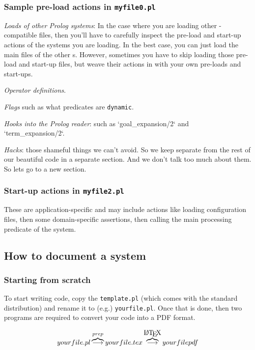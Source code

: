 \subsubsection{Sample pre-load actions in {\tt myfile0.pl}}

\bi \item{\em Loads of other Prolog systems}: In the case where you
are loading other {\PROD}-compatible  files, then  you'll have to
carefully inspect the pre-load and start-up actions of the systems
you are loading. In the best case, you can just load the main files
of the other {\PROD}s. However, sometimes you have to skip loading
those pre-load and start-up files, but weave their actions in with
your own pre-loads and start-ups. \item {\em Operator definitions}.
\item {\em Flags} such as what predicates are {\tt dynamic}. \item
{\em Hooks into the Prolog reader}: such as `goal_expansion/2` and
`term_expansion/2`. \item {\em Hacks}: those shameful things  we
can't avoid. So we   keep separate from the rest of our beautiful
code in a separate section. And we don't talk too much about them. So
lets go to a new section. \ei

\subsubsection{Start-up actions in {\tt myfile2.pl}}

These are application-specific and may include actions like loading
configuration files, then some domain-specific assertions, then
calling the main processing predicate of the system.


\subsection{How to document a {\PROD} system}

\subsubsection{Starting from scratch}

To start writing  {\PROD} code,   copy the {\tt template.pl}
(which comes with the standard {\PROD} distribution) and  rename
it to (e.g.) {\tt yourfile.pl}. Once that is done, then two
programs are required to convert  your code into a PDF format.

\[
yourfile.pl \overbrace{\longrightarrow}^{prep} yourfile.tex
\overbrace{\longrightarrow}^{{\mbox \LaTeX}} yourfilepdf
\]

